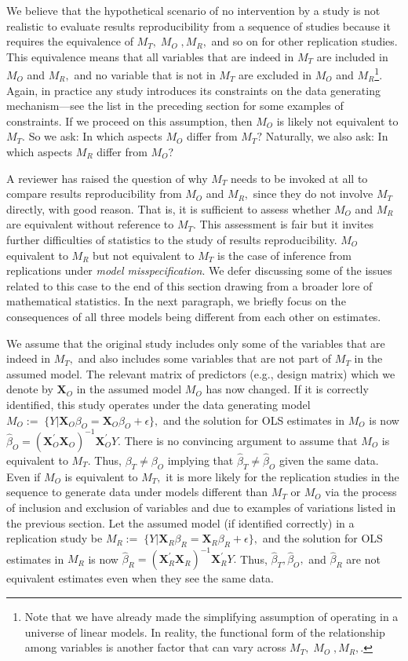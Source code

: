 \documentclass[meta,authordate]{jote-new-article}
\newcommand{\X}{\mathbf{X}}
\newcounter{result}
\begin{document}
We believe that the hypothetical scenario of no intervention by a study is not realistic to evaluate results reproducibility from a sequence of studies because it requires the equivalence of $M_T,\;M_O\;,M_R,$ and so on for other replication studies. This equivalence means that all variables that are indeed in $M_T$ are included in $M_O$ and $M_R,$ and no variable that is not in $M_T$ are excluded in $M_O$ and $M_R$\footnote{Note that we have already made the simplifying assumption of operating in a universe of linear models. In reality, the functional form of the relationship among variables is another factor that can vary across $M_T,\;M_O\;,M_R,$.}. Again, in practice any study introduces its constraints on the data generating mechanism---see the list in the preceding section for some examples of constraints. If we proceed on this assumption, then $M_O$ is likely not equivalent to $M_T.$ So we ask: In which aspects $M_O$ differ from $M_T?$ Naturally, we also ask: In which aspects $M_R$ differ from $M_O$?

A reviewer has raised the question of why $M_T$ needs to be invoked at all to compare results reproducibility from $M_O$ and $M_R,$ since they do not involve $M_T$ directly, with good reason. That is, it is sufficient to assess whether $M_O$ and $M_R$ are equivalent without reference to $M_T$. This assessment is fair but it invites further difficulties of statistics to the study of results reproducibility. $M_O$ equivalent to $M_R$ but not equivalent to $M_T$ is the case of inference from replications under {\em model misspecification}. We defer discussing some of the issues related to this case to the end of this section drawing from a broader lore of mathematical statistics. In the next paragraph, we briefly focus on the consequences of all three models being different from each other on estimates.

We assume that the original study includes only some of the variables that are indeed in $M_T,$ and also includes some variables that are not part of $M_T$ in the assumed model. The relevant matrix of predictors (e.g., design matrix) which we denote by $\X_{O}$ in the assumed model $M_O$ has now changed. If it is correctly identified, this study operates under the data generating model
%
$M_O:=\; \{Y|\X_{O}\beta_{O} = \X_{O}\beta_{O}+\epsilon\},$
%
and the solution for OLS estimates in $M_O$ is now
$\hat{\beta}_{O}= (\X_{O}^{'}\X_{O})^{-1}\X_{O}^{'} Y.$
%
There is no convincing argument to assume that $M_O$ is equivalent to $M_T.$ Thus, $\beta_{T} \neq \beta_{O}$ implying that $\hat{\beta}_{T} \neq \hat{\beta}_{O}$ given the same data. Even if $M_O$ is equivalent to $M_T,$ it is more likely for the replication studies in the sequence to generate data under models different than $M_T$ or $M_O$ via the process of inclusion and exclusion of variables and due to examples of variations listed in the previous section. Let the assumed model (if identified correctly) in a replication study be
%
$M_R:=\; \{Y|\X_{R}\beta_{R} =\X_{R}\beta_{R}+\epsilon\},
$
%
and the solution for OLS estimates in $M_R$ is now
$\hat{\beta}_{R}= (\X_{R}^{'}\X_{R})^{-1}\X_{R}^{'} Y.$
%
%
Thus, $\hat{\beta}_{T}, \hat{\beta}_{O},$ and $\hat{\beta}_{R}$ are not equivalent estimates even when they see the same data.
\end{document}
